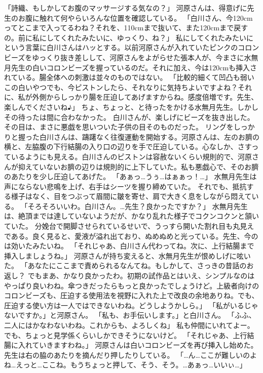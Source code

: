 「詩織、もしかしてお腹のマッサージする気なの？」
河原さんは、得意げに先生のお腹に触れて何やらいろんな位置を確認している。
「白川さん、今120cmってとこまで入ってるわね？それを、110cmまで抜いて、また120cmまで戻すの。前に私にしてくれたみたいに、ゆっくり、ね？」
私にしてくれたみたいに という言葉に白川さんはハッとする。以前河原さんが入れていたピンクのコロンビーズをゆっくり抜き差しして、河原さんをよがらせた張本人が、今まさに水無月先生の白いコロンビーズを握っているのだ。それに加え、今は120cmも挿入されている。腸全体への刺激は並々のものではない。
「比較的細くて凹凸も弱いこの白いやつでも、今ピストンしたら、それなりに気持ちよいですよね？それに、私が外側からしっかり腸を圧迫してあげますからね。感度倍増です。先生、楽しんでくださいね♪」
ちょ、ちょっと、と待ったをかける水無月先生。しかしその待ったは間に合わなかった。
白川さんが、楽しげにビーズを抜き出した。その目は、まさに悪戯を思いついた子供の目そのものだった。
リングをしっかりと握った白川さんは、躊躇なく往復運動を開始する。河原さんは、左のお臍の横と、左脇腹の下行結腸の入り口の辺りを手で圧迫している。心なしか、さすっているようにも見える。白川さんのピストンは容赦ないくらい規則的で、河原さんが抑えていないお臍の辺りは規則的に上下していた。私も悪戯心で、そのお臍のあたりを少し圧迫してあげた。
「あぁっ…うぅ…はぁぁっ！…」
水無月先生は声にならない悲鳴を上げ、右手はシーツを握り締めていた。
それでも、抵抗する様子はなく、目をつぶって眉間に皺を寄せ、肩で大きく息をしながら悶えている。
「そろそろいいわ。白川さん。…先生？良かったですか？」
水無月先生は、絶頂までは達していないようだが、かなり乱れた様子でコクンコクンと頷いていた。
分娩台で開脚させられているせいで、うっすら開いた割れ目も丸見えである。良く見ると、愛液が溢れ出ており、ぬめぬめと光っている。先生、今のは効いたみたいね。
「それじゃあ、白川さん代わってね。次に、上行結腸まで挿入しましょうね。」
河原さんが持ち変えると、水無月先生が恨めしげに呟いた。
「あなたにここまで責められるなんてね。もしかして、さっきの昔話のお返し？ でもまあ、かなり良かったわ。初期の試作品とはいえ、シンプルなのはやっぱり良いわね。傘つきだったらもっと良かったでしょうけど。上級者向けのコロンビーズも、圧迫する使用法を視野に入れた上で改良の余地ありね。でも、圧迫する使い方は一人ではできないわね。どうしようかしら。」
「私がいるじゃないですか。」と河原さん。
「私も、お手伝いします。」と白川さん。
「ふふ、二人にはかなわないわね。これからも、よろしくね」
私も仲間にいれてよー。でも、ちょっと見学係くらいしかできそうにないけど。
「それじゃあ、上行結腸に入れていきますわね。」
河原さんは白いコロンビーズを再び挿入し始めた。先生は右の脇のあたりを摘んだり押したりしている。
「…ん…ここが難しいのよね…えっと…ここね。もうちょっと押して、そう、そう。…あぁっ…いいぃ…」
